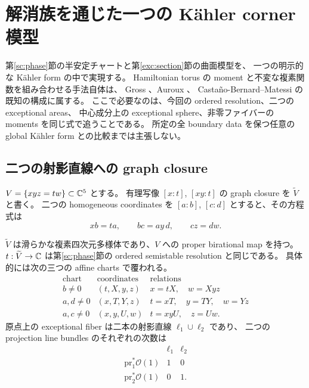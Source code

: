 \section{解消族を通じた一つの Kähler corner 模型}
\label{tc:section}

第\ref{sc:phase}節の半安定チャートと第\ref{exc:section}節の曲面模型を、
一つの明示的な Kähler form の中で実現する。
Hamiltonian torus の moment と不変な複素関数を組み合わせる手法自体は、
Gross \cite[\S\S1--2]{gross-toric}、Auroux \cite[\S3.3.1]{auroux-blowup}、
Casta\~no-Bernard--Matessi \cite[\S\S3.4,5.1]{cbm-conifold} の既知の構成に属する。
ここで必要なのは、今回の ordered resolution、二つの exceptional areas、
中心成分上の exceptional sphere、非零ファイバーの moments を同じ式で追うことである。
所定の全 boundary data を保つ任意の global Kähler form との比較までは主張しない。

\subsection{二つの射影直線への graph closure}

$V=\{xyz=tw\}\subset\mathbb C^5$ とする。
有理写像 $[x:t]$, $[xy:t]$ の graph closure を $\widetilde V$ と書く。
二つの homogeneous coordinates を $[a:b]$, $[c:d]$ とすると、その方程式は
\begin{equation}\label{tc:incidence}
 xb=ta,\qquad bc=ay\,d,\qquad cz=dw.
\end{equation}

\begin{proposition}\label{tc:resolution}
$\widetilde V$ は滑らかな複素四次元多様体であり、$V$ への proper birational map を持つ。
$t:\widetilde V\to\mathbb C$ は第\ref{sc:phase}節の ordered semistable resolution と同じである。
具体的には次の三つの affine charts で覆われる。
\[
\begin{array}{c|c|c}
\text{chart}&\text{coordinates}&\text{relations}\\ \hline
 b\ne0 &(t,X,y,z)&x=tX,\quad w=Xyz\\
 a,d\ne0 &(x,T,Y,z)&t=xT,\quad y=TY,\quad w=Yz\\
 a,c\ne0 &(x,y,U,w)&t=xyU,\quad z=Uw.
\end{array}
\]
原点上の exceptional fiber は二本の射影直線 $\ell_1\cup\ell_2$ であり、
二つの projection line bundles のそれぞれの次数は
\[
\begin{array}{c|cc}
 &\ell_1&\ell_2\\ \hline
 \mathrm{pr}_1^*\mathcal O(1)&1&0\\
 \mathrm{pr}_2^*\mathcal O(1)&0&1.
\end{array}
\]
\end{proposition}

